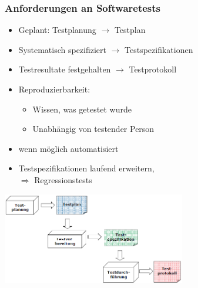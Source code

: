 \subsubsection{Anforderungen an Softwaretests}
	\begin{minipage}{10cm}
	\begin{itemize}
			\item Geplant: Testplanung $\rightarrow$ Testplan
			\item Systematisch spezifiziert $\rightarrow$ Testspezifikationen
			\item Testresultate festgehalten $\rightarrow$ Testprotokoll
			\item Reproduzierbarkeit:
			\begin{itemize}
				\item Wissen, was getestet wurde
				\item Unabhängig von testender Person
			\end{itemize}
			\item wenn möglich automatisiert
			\item Testspezifikationen laufend erweitern,\\
			$\Rightarrow$ Regressionstests
		\end{itemize}
	\end{minipage}
	\begin{minipage}{8cm}
		\includegraphics[width=8cm]{images/sofwaretest.png}
	\end{minipage}
\clearpage
\pagebreak

